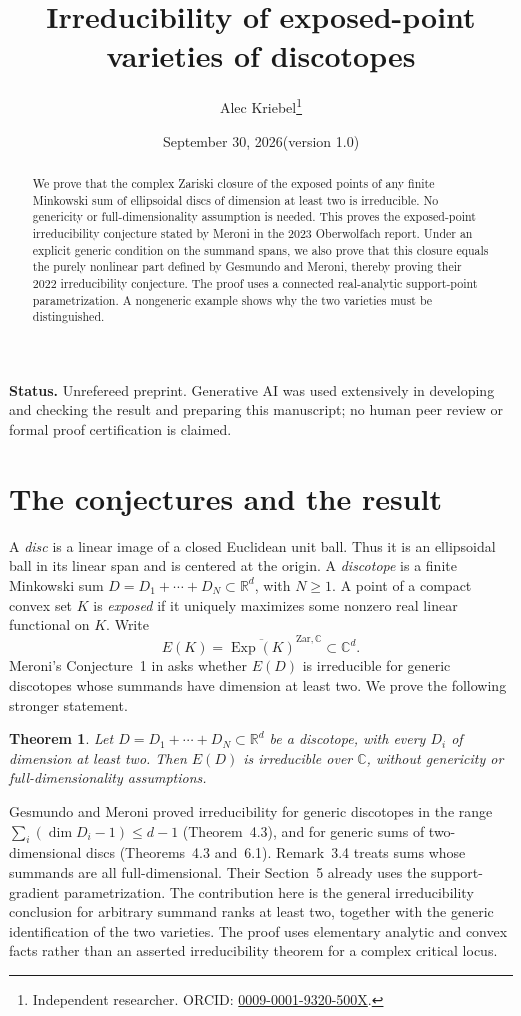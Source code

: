 \documentclass[11pt]{article}
\title{Irreducibility of exposed-point varieties of discotopes}
\author{Alec Kriebel\thanks{Independent researcher. ORCID:
  \href{https://orcid.org/0009-0001-9320-500X}{0009-0001-9320-500X}.}}
\date{September 30, 2026\quad (version 1.0)}
\newtheorem{theorem}{Theorem}
\newcommand{\Exp}{\operatorname{Exp}}
\newcommand{\R}{\mathbb R}
\newcommand{\C}{\mathbb C}
\begin{document}
\maketitle
\begin{abstract}
We prove that the complex Zariski closure of the exposed points of any
finite Minkowski sum of ellipsoidal discs of dimension at least two is
irreducible. No genericity or full-dimensionality assumption is needed.
This proves the exposed-point irreducibility conjecture stated by Meroni
in the 2023 Oberwolfach report. Under an explicit generic condition on
the summand spans, we also prove that this closure equals the purely
nonlinear part defined by Gesmundo and Meroni, thereby proving their
2022 irreducibility conjecture. The proof uses a connected real-analytic
support-point parametrization. A nongeneric example shows why the two
varieties must be distinguished.
\end{abstract}
\noindent\textbf{Status.} Unrefereed preprint. Generative AI was used
extensively in developing and checking the result and preparing this
manuscript; no human peer review or formal proof certification is claimed.

\section{The conjectures and the result}

A \emph{disc} is a linear image of a closed Euclidean unit ball. Thus
it is an ellipsoidal ball in its linear span and is centered at the
origin. A \emph{discotope} is a finite Minkowski sum
\(D=D_1+\cdots+D_N\subset\R^d\), with \(N\ge1\).
A point of a compact convex set \(K\) is \emph{exposed} if it uniquely
maximizes some nonzero real linear functional on \(K\). Write
\[
 E(K)=\overline{\Exp(K)}^{\mathrm{Zar},\C}\subset\C^d.
\]
Meroni's Conjecture~1 in \cite[p.~830]{Meroni2023} asks whether \(E(D)\)
is irreducible for generic discotopes whose summands have dimension at
least two. We prove the following stronger statement.

\begin{theorem}\label{thm:main}
Let \(D=D_1+\cdots+D_N\subset\R^d\) be a discotope, with every
\(D_i\) of dimension at least two. Then \(E(D)\) is irreducible over
\(\C\), without genericity or full-dimensionality assumptions.
\end{theorem}

Gesmundo and Meroni proved irreducibility for generic discotopes in
the range \(\sum_i(\dim D_i-1)\le d-1\) (Theorem~4.3), and for
generic sums of two-dimensional discs (Theorems~4.3 and~6.1).
Remark~3.4 treats sums whose summands are all full-dimensional.
Their Section~5 already uses the support-gradient parametrization.
The contribution here is the general irreducibility conclusion for
arbitrary summand ranks at least two, together with the generic
identification of the two varieties. The proof uses elementary
analytic and convex facts rather than an asserted irreducibility
theorem for a complex critical locus.
\end{document}
